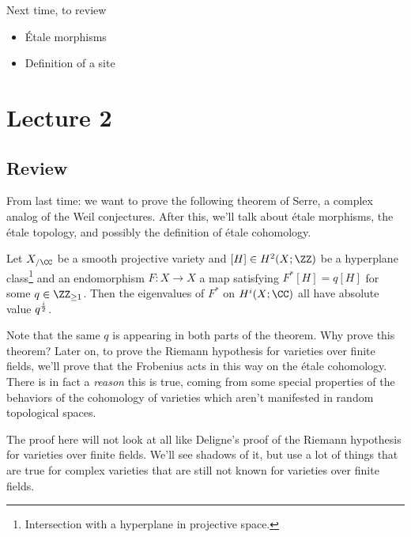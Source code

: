 Next time, to review

\begin{itemize}
\tightlist
\item
  Étale morphisms
\item
  Definition of a site
\end{itemize}

\hypertarget{lecture-2}{%
\section{Lecture 2}\label{lecture-2}}

\hypertarget{review}{%
\subsection{Review}\label{review}}

From last time: we want to prove the following theorem of Serre, a
complex analog of the Weil conjectures. After this, we'll talk about
étale morphisms, the étale topology, and possibly the definition of
étale cohomology.

\begin{theorem}[Serre]

Let \(X_{/\CC}\) be a smooth projective variety and
\([H]\in H^2(X; \ZZ)\) be a hyperplane class\footnote{Intersection with
  a hyperplane in projective space.} and an endomorphism \(F:X\to X\) a
map satisfying \(F^*[H] = q[H]\) for some \(q\in \ZZ_{\geq 1}\). Then
the eigenvalues of \(F^*\) on \(H^i(X;\CC)\) all have absolute value
\(q^{i\over 2}\).

\end{theorem}

Note that the same \(q\) is appearing in both parts of the theorem. Why
prove this theorem? Later on, to prove the Riemann hypothesis for
varieties over finite fields, we'll prove that the Frobenius acts in
this way on the étale cohomology. There is in fact a \emph{reason} this
is true, coming from some special properties of the behaviors of the
cohomology of varieties which aren't manifested in random topological
spaces.

\begin{warnings}

The proof here will not look at all like Deligne's proof of the Riemann
hypothesis for varieties over finite fields. We'll see shadows of it,
but use a lot of things that are true for complex varieties that are
still not known for varieties over finite fields.

\end{warnings}

